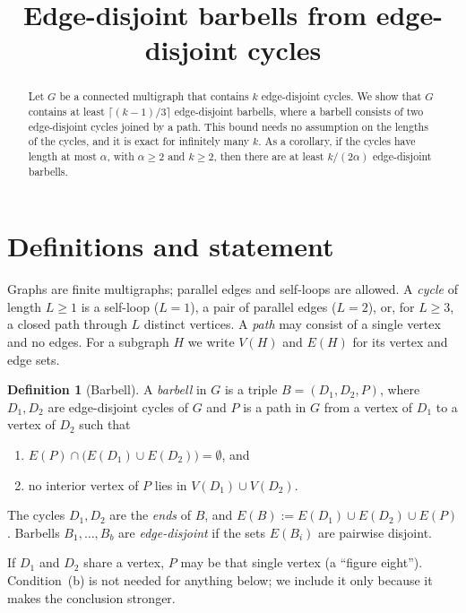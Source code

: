 \documentclass[11pt,a4paper]{article}
\title{Edge-disjoint barbells from edge-disjoint cycles}
\date{}
\theoremstyle{definition}
\newtheorem{definition}[theorem]{Definition}
\theoremstyle{remark}
\begin{document}
\maketitle

\begin{abstract}
Let \(G\) be a connected multigraph that contains \(k\) edge-disjoint cycles.
We show that \(G\) contains at least \(\lceil (k-1)/3\rceil\) edge-disjoint
barbells, where a barbell consists of two edge-disjoint cycles joined by a
path. This bound needs no assumption on the lengths of the cycles, and it is
exact for infinitely many \(k\). As a corollary, if the cycles have length at
most \(\alpha\), with \(\alpha\ge2\) and \(k\ge2\), then there are at least
\(k/(2\alpha)\) edge-disjoint barbells.
\end{abstract}

\section{Definitions and statement}

Graphs are finite multigraphs; parallel edges and self-loops are allowed. A
\emph{cycle} of length \(L\ge1\) is a self-loop (\(L=1\)), a pair of parallel
edges (\(L=2\)), or, for \(L\ge3\), a closed path through \(L\) distinct
vertices. A \emph{path} may consist of a single vertex and no edges. For a
subgraph \(H\) we write \(V(H)\) and \(E(H)\) for its vertex and edge sets.

\begin{definition}[Barbell]\label{def:barbell}
A \emph{barbell} in \(G\) is a triple \(B=(D_1,D_2,P)\), where \(D_1,D_2\) are
edge-disjoint cycles of \(G\) and \(P\) is a path in \(G\) from a vertex of
\(D_1\) to a vertex of \(D_2\) such that
\begin{enumerate}[label=(\alph*)]
\item \(E(P)\cap\bigl(E(D_1)\cup E(D_2)\bigr)=\emptyset\), and
\item no interior vertex of \(P\) lies in \(V(D_1)\cup V(D_2)\).
\end{enumerate}
The cycles \(D_1,D_2\) are the \emph{ends} of \(B\), and
\(E(B):=E(D_1)\cup E(D_2)\cup E(P)\). Barbells \(B_1,\dots,B_b\) are
\emph{edge-disjoint} if the sets \(E(B_i)\) are pairwise disjoint.
\end{definition}

If \(D_1\) and \(D_2\) share a vertex, \(P\) may be that single vertex
(a ``figure eight''). Condition~(b) is not needed for anything below; we
include it only because it makes the conclusion stronger.
\end{document}
